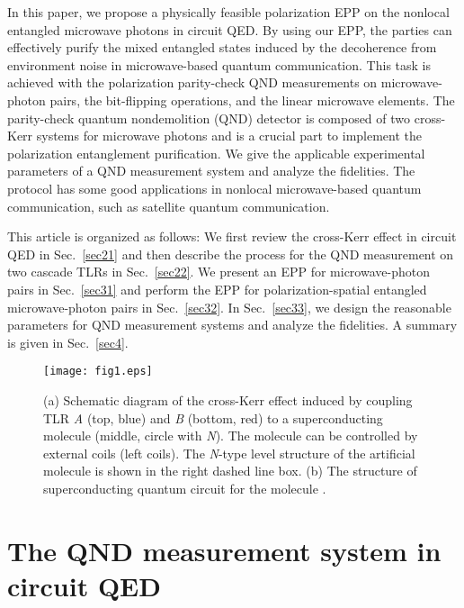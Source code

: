 \documentclass[showpacs,aps,graphicx,twocolumn]{revtex4}
\begin{document}
In this paper, we propose a physically feasible polarization
EPP on the nonlocal entangled microwave photons in circuit QED.
By using our EPP, the parties can effectively purify the mixed
entangled states induced by  the decoherence from environment noise
in microwave-based quantum communication. This task is achieved with
the polarization parity-check QND measurements on microwave-photon
pairs, the bit-flipping operations, and the linear microwave
elements. The parity-check quantum nondemolition (QND) detector is composed of two
cross-Kerr systems for microwave photons and is a crucial part to
implement the polarization entanglement purification. We give the
applicable experimental parameters of a QND measurement system and
analyze the fidelities. The protocol has some good applications in
nonlocal microwave-based quantum communication, such as satellite
quantum communication.





This article is organized as follows:  We first review the
cross-Kerr effect in circuit QED in Sec.~\ref{sec21} and then
describe the process for the QND measurement on two cascade TLRs in
Sec.~\ref{sec22}. We present an EPP for microwave-photon pairs in
Sec.~\ref{sec31} and perform the EPP for polarization-spatial
entangled microwave-photon pairs in Sec.~\ref{sec32}. In
Sec.~\ref{sec33}, we design the reasonable parameters for QND
measurement systems and analyze the fidelities. A
summary is given in Sec.~\ref{sec4}.



\begin{figure}[!ht]%
\begin{center}
\texttt{[image: fig1.eps]}
\caption{(a) Schematic diagram of the cross-Kerr effect induced by
coupling TLR \emph{A} (top, blue) and \emph{B} (bottom, red) to a
superconducting molecule (middle, circle with \emph{N}). The
molecule can be controlled by external coils (left coils). The
\emph{N}-type level structure of the artificial molecule is shown in
the right dashed line box. (b) The  structure of superconducting
quantum circuit for the molecule \cite{YHu}.} \label{fig1}
\end{center}
\end{figure}






\section{The QND measurement system in circuit QED} \label{basic}
\end{document}
